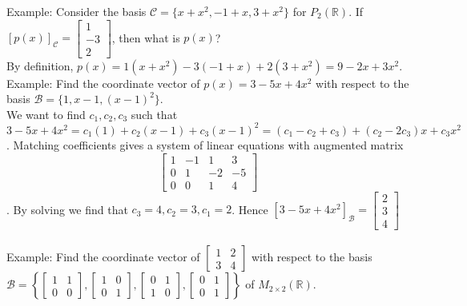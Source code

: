 \documentclass[10pt,letter]{article}
\begin{document}
Example: Consider the basis $\mathcal{C}=\{x+x^2,-1+x,3+x^2\}$ for $P_2(\mathbb{R})$. If $[p(x)]_\mathcal{C}=\begin{bmatrix}1\\-3\\2\end{bmatrix}$, then what is $p(x)$? \\ 
By definition, $p(x)=1(x+x^2)-3(-1+x)+2(3+x^2)=9-2x+3x^2$. \\ 
Example: Find the coordinate vector of $p(x)=3-5x+4x^2$ with respect to the basis $\mathcal{B}=\{1,x-1,(x-1)^2\}$. \\ 
We want to find $c_1,c_2,c_3$ such that $3-5x+4x^2=c_1(1)+c_2(x-1)+c_3(x-1)^2=(c_1-c_2+c_3)+(c_2-2c_3)x+c_3x^2$. Matching coefficients gives a system of linear equations with augmented matrix $$\left[\begin{array}{rrr|r}
   1 & -1 & 1 & 3\\
    0 & 1 & -2 & -5 \\
    0 & 0 & 1 & 4 
\end{array}\right]$$. By solving we find that $c_3=4,c_2=3,c_1=2$. Hence $[3-5x+4x^2]_\mathcal{B}=\begin{bmatrix}2\\3\\4\end{bmatrix}$ \\\\ 
Example: Find the coordinate vector of $\begin{bmatrix}1&2\\3&4\end{bmatrix}$ with respect to the basis $\mathcal{B}=\left\{\begin{bmatrix}1&1\\0&0\end{bmatrix},\begin{bmatrix}1&0\\0&1\end{bmatrix},\begin{bmatrix}0&1\\1&0\end{bmatrix},\begin{bmatrix}0&1\\0&1\end{bmatrix}\right\}$ of $M_{2\times 2}(\mathbb{R})$. \\ 
\end{document}
